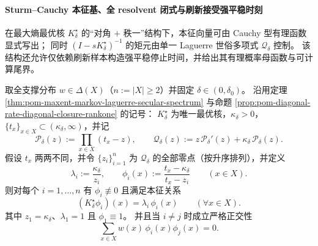 \paragraph{Sturm--Cauchy 本征基、全 resolvent 闭式与刷新接受强平稳时刻}
在最大熵最优核 \(K^\star_\delta\) 的“对角 \(+\) 秩一”结构下，本征向量可由 Cauchy 型有理函数显式写出；
同时 \((I-sK^\star_\delta)^{-1}\) 的矩元由单一 Laguerre 世俗多项式 \(\mathcal Q_\delta\) 控制。
该结构还允许仅依赖刷新样本构造强平稳停止时间，并给出其有理概率母函数与可计算尾界。
\par

\begin{theorem}\label{thm:pom-diagonal-rate-sturm-cauchy-eigenbasis}
取全支撑分布 \(w\in\Delta(X)\)（\(n:=|X|\ge 2\)）并固定 \(\delta\in(0,\delta_0)\)。
沿用定理 \ref{thm:pom-maxent-markov-laguerre-secular-spectrum} 与命题 \ref{prop:pom-diagonal-rate-diagonal-closure-rankone} 的记号：
\(K^\star_\delta\) 为唯一最优核，\(\kappa_\delta>0\)，\(\{t_x\}_{x\in X}\subset(\kappa_\delta,\infty)\)，并记
\[
\mathcal P_\delta(z):=\prod_{x\in X}(t_x-z),
\qquad
\mathcal Q_\delta(z):=z\,\mathcal P_\delta'(z)+\kappa_\delta\,\mathcal P_\delta(z).
\]
假设 \(t_x\) 两两不同，并令 \(\{z_i\}_{i=1}^{n}\) 为 \(\mathcal Q_\delta\) 的全部零点（按升序排列），并定义
\[
\lambda_i:=\frac{\kappa_\delta}{z_i},
\qquad
\phi_i(x):=\frac{t_x-\kappa_\delta}{t_x-z_i}\qquad(x\in X).
\]
则对每个 \(i=1,\dots,n\) 有 \(\phi_i\not\equiv 0\) 且满足本征关系
\[
(K^\star_\delta\phi_i)(x)=\lambda_i\,\phi_i(x)\qquad(\forall x\in X).
\]
其中 \(z_1=\kappa_\delta\)、\(\lambda_1=1\) 且 \(\phi_1\equiv 1\)。
并且当 \(i\ne j\) 时成立严格正交性
\[
\sum_{x\in X}w(x)\,\phi_i(x)\phi_j(x)=0.
\]
\end{theorem}
